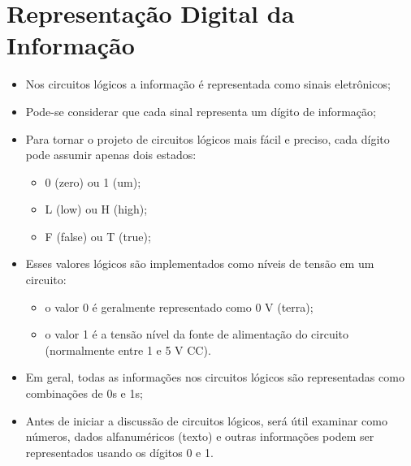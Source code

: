 

\subtitle{Representação Digital da Informação} %



\begin{frame}
	\titlepage
\end{frame} 


\section{Representação Digital da Informação} %

\begin{frame}{\insertsection} 
	\begin{itemize}
		\item Nos circuitos lógicos a informação é representada como sinais eletrônicos;
		\item Pode-se considerar que cada sinal representa um dígito de informação; 
		\item Para tornar o projeto de circuitos lógicos mais fácil e preciso, cada dígito pode assumir apenas dois estados:
		\begin{itemize}
		    \item 0 (zero) ou 1 (um);
		    \item L (low) ou H (high);
		    \item F (false) ou T (true);
		\end{itemize}
    \end{itemize}
\end{frame}

\begin{frame}{\insertsection} 
	\begin{itemize}
		\item Esses valores lógicos são implementados como níveis de tensão em um circuito: 
		\begin{itemize}
		    \item o valor 0 é geralmente representado como 0 V (terra);
		    \item o valor 1 é a tensão nível da fonte de alimentação do circuito (normalmente entre 1 e 5 V CC).
		\end{itemize}
		\item Em geral, todas as informações nos circuitos lógicos são representadas como combinações de 0s e 1s;
		\item Antes de iniciar a discussão de circuitos lógicos, será útil examinar como números, dados alfanuméricos (texto) e outras informações podem ser representados usando os dígitos 0 e 1.
    \end{itemize}
\end{frame}

